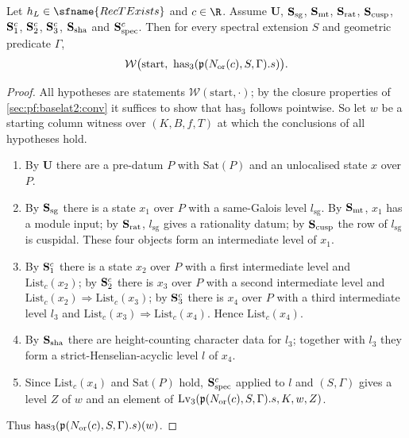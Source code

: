 \begin{proposition}\label{pf:baselat2:has3}
Let $h_L\in\sfname{RecTExists}$ and $c\in\R$. Assume $\mathbf{U}$,
$\mathbf{S}_{\mathrm{sg}}$, $\mathbf{S}_{\mathrm{mt}}$, $\mathbf{S}_{\mathrm{rat}}$, $\mathbf{S}_{\mathrm{cusp}}$, $\mathbf{S}_{\mathrm{1}}^{c}$,
$\mathbf{S}_{\mathrm{2}}^{c}$, $\mathbf{S}_{\mathrm{3}}^{c}$, $\mathbf{S}_{\mathrm{sha}}$ and $\mathbf{S}_{\mathrm{spec}}^{c}$. Then for every
spectral extension $S$ and geometric predicate $\Gamma$,
\[
  \mathcal{W}\bigl(\mathrm{start},\ \mathrm{has}_3(\bltwop(\bltwoN{or}(c),S,\Gamma).s)\bigr).
\]
\end{proposition}

\begin{proof}
All hypotheses are statements $\mathcal{W}(\mathrm{start},\cdot)$; by the closure properties of
\cref{sec:pf:baselat2:conv} it suffices to show that $\mathrm{has}_3$ follows pointwise. So let $w$ be a
starting column witness over $(K,B,f,T)$ at which the conclusions of all hypotheses hold.
\begin{enumerate}[label=(\alph*)]
\item By $\mathbf{U}$ there are a pre-datum $P$ with $\mathrm{Sat}(P)$ and an
  unlocalised state $x$ over $P$.
\item By $\mathbf{S}_{\mathrm{sg}}$ there is a state $x_1$ over $P$ with a same-Galois level $l_{\mathrm{sg}}$.
  By $\mathbf{S}_{\mathrm{mt}}$, $x_1$ has a module input; by $\mathbf{S}_{\mathrm{rat}}$, $l_{\mathrm{sg}}$ gives a rationality datum;
  by $\mathbf{S}_{\mathrm{cusp}}$ the row of $l_{\mathrm{sg}}$ is cuspidal. These four objects form an intermediate level of
  $x_1$.
\item By $\mathbf{S}_{\mathrm{1}}^{c}$ there is a state $x_2$ over $P$ with a first intermediate level and
  $\mathrm{List}_c(x_2)$; by $\mathbf{S}_{\mathrm{2}}^{c}$ there is $x_3$ over $P$ with a second intermediate level
  and $\mathrm{List}_c(x_2)\Rightarrow\mathrm{List}_c(x_3)$; by $\mathbf{S}_{\mathrm{3}}^{c}$ there is $x_4$ over $P$
  with a third intermediate level $l_3$ and $\mathrm{List}_c(x_3)\Rightarrow\mathrm{List}_c(x_4)$. Hence
  $\mathrm{List}_c(x_4)$.
\item By $\mathbf{S}_{\mathrm{sha}}$ there are height-counting character data for $l_3$; together with $l_3$ they
  form a strict-Henselian-acyclic level $l$ of $x_4$.
\item Since $\mathrm{List}_c(x_4)$ and $\mathrm{Sat}(P)$ hold, $\mathbf{S}_{\mathrm{spec}}^{c}$ applied to $l$ and
  $(S,\Gamma)$ gives a level $Z$ of $w$ and an element of $\mathrm{Lv}_3(\mathfrak{p}(N_{\mathrm{or}}(c),S,\Gamma).s,K,w,Z)$.
\end{enumerate}
Thus $\mathrm{has}_3(\mathfrak{p}(N_{\mathrm{or}}(c),S,\Gamma).s)(w)$.
\end{proof}


